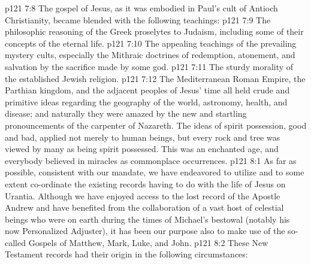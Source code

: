 \vs p121 7:8 The gospel of Jesus, as it was embodied in Paul’s cult of Antioch Christianity, became blended with the following teachings:
\pc \vs p121 7:9 \bibnobreakspace The philosophic reasoning of the Greek proselytes to Judaism, including some of their concepts of the eternal life.
\vs p121 7:10 \bibnobreakspace The appealing teachings of the prevailing mystery cults, especially the Mithraic doctrines of redemption, atonement, and salvation by the sacrifice made by some god.
\vs p121 7:11 \bibnobreakspace The sturdy morality of the established Jewish religion.
\pc \vs p121 7:12 The Mediterranean Roman Empire, the Parthian kingdom, and the adjacent peoples of Jesus’ time all held crude and primitive ideas regarding the geography of the world, astronomy, health, and disease; and naturally they were amazed by the new and startling pronouncements of the carpenter of Nazareth. The ideas of spirit possession, good and bad, applied not merely to human beings, but every rock and tree was viewed by many as being spirit possessed. This was an enchanted age, and everybody believed in miracles as commonplace occurrences.
\vs p121 8:1 As far as possible, consistent with our mandate, we have endeavored to utilize and to some extent co\hyp{}ordinate the existing records having to do with the life of Jesus on Urantia. Although we have enjoyed access to the lost record of the Apostle Andrew and have benefited from the collaboration of a vast host of celestial beings who were on earth during the times of Michael’s bestowal (notably his now Personalized Adjuster), it has been our purpose also to make use of the so\hyp{}called Gospels of Matthew, Mark, Luke, and John.
\vs p121 8:2 These New Testament records had their origin in the following circumstances:
